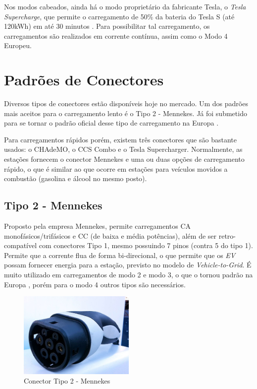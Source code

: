         Nos modos cabeados, ainda há o modo proprietário da fabricante Tesla, o \textit{Tesla Supercharge}, que permite o carregamento de 50\% da bateria do Tesla S (até 120kWh) em até 30 minutos \cite{tesla-supercharge}. Para possibilitar tal carregamento, os carregamentos são realizados em corrente contínua, assim como o Modo 4 Europeu.

  \section{Padrões de Conectores}
  \label{stateofart:plugs}

      Diversos tipos de conectores estão disponíveis hoje no mercado. Um dos padrões mais aceitos para o carregamento lento é o Tipo 2 - Mennekes. Já foi submetido para se tornar o padrão oficial desse tipo de carregamento na Europa \cite{mckinsey-report-ev}.

      Para carregamentos rápidos porém, existem três conectores que são bastante usados: o CHAdeMO, o CCS Combo e o Tesla Supercharger. Normalmente, as estações fornecem o conector Mennekes e uma ou duas opções de carregamento rápido, o que é similar ao que ocorre em estações para veículos movidos a combustão (gasolina e álcool no mesmo posto).

      \subsection{Tipo 2 - Mennekes}
      \label{stateofart:plugs:mennekes}

        Proposto pela empresa Mennekes, permite carregamentos \ac{CA} monofásicos/trifásicos e \ac{CC} (de baixa e média potências), além de ser retro-compatível com conectores Tipo 1, mesmo possuindo 7 pinos (contra 5 do tipo 1). Permite que a corrente flua de forma bi-direcional, o que permite que os \textit{\ac{EV}} possam fornecer energia para a estação, previsto no modelo de \textit{Vehicle-to-Grid}. É muito utilizado em carregamentos de modo 2 e modo 3, o que o tornou padrão na Europa \cite{mennekes-news-standardplug}, porém para o modo 4 outros tipos são necessários.

        \begin{figure}[H]
          \begin{center}
            \includegraphics[width=0.50\textwidth,natwidth=1024,natheight=755]{assets/images/connectors-mennekes.jpg}
            \caption{Conector Tipo 2 - Mennekes}
            \label{fig:mennekes}
          \end{center}
        \end{figure}

